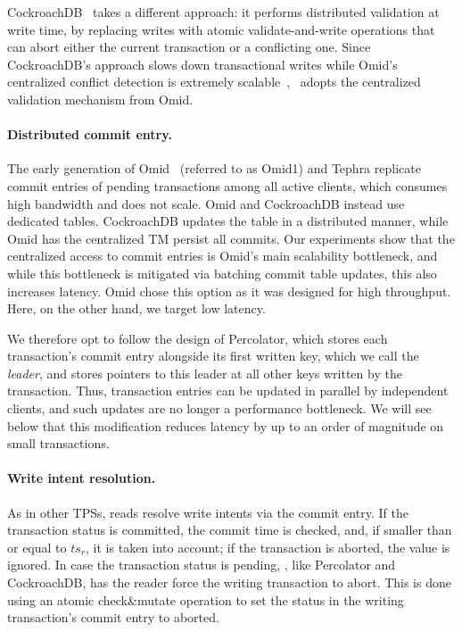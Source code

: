 CockroachDB~\cite{cockroach}  takes a different approach: it performs distributed validation at write time, by replacing writes with atomic validate-and-write 
operations that can abort either the current transaction or a conflicting one. Since CockroachDB's approach slows down transactional writes 
while Omid's centralized conflict detection is extremely scalable~\cite{Omid2017},
\sys\ adopts the centralized validation mechanism from Omid. 


\paragraph{Distributed commit entry.}
The early generation of Omid~\cite{OmidICDE2014} (referred to as Omid1) and Tephra replicate commit entries 
of pending transactions among all active clients, 
which consumes high bandwidth and does not scale. Omid and CockroachDB instead use dedicated tables. CockroachDB updates the table in a distributed manner, 
while Omid has the centralized TM persist all commits. 
Our experiments show that the centralized access to commit entries is Omid's main scalability bottleneck, 
and while this bottleneck is mitigated via batching commit table updates, this also increases latency.
Omid chose this  option as it was designed for high throughput. Here, on the other hand, we target  low latency. 

We therefore opt to follow the design of Percolator, which stores each transaction's commit entry alongside its first written key,
which we call the \emph{leader}, and stores pointers to this leader at all other keys written by the transaction. 
Thus,  transaction entries can be updated in parallel by 
independent clients, and such updates are no longer a performance bottleneck. 
We will see below that this modification reduces latency
by up to an order of magnitude on small transactions.

\paragraph{Write intent resolution.}

As in other TPSs, reads resolve write intents via the commit entry.
If the transaction status is committed, the commit time is checked, and, if smaller than or equal to $ts_r$, it is taken into account;
if the transaction is aborted, the value is ignored.
In case the transaction status is pending, \sys, like Percolator and CockroachDB, has the reader
force the writing transaction to abort. This is done using an atomic check\&mutate operation to set the status in the
writing transaction's commit entry to aborted.

